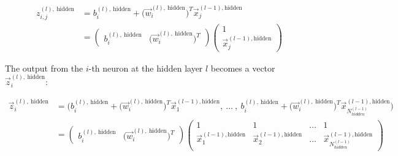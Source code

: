 \documentclass[11pt]{article}
\begin{document}
\[
\begin{aligned}
z_{i,j}^{(l),\ \text{hidden}} &= b_i^{(l), \ \text{hidden}} + \big(\vec{w}_{i}^{(l), \ \text{hidden}}\big)^T\vec{x}_j^{(l-1),\text{hidden} } \\
&= 
\begin{pmatrix}
b_i^{(l), \ \text{hidden}}  & \big(\vec{w}_{i}^{(l), \ \text{hidden}}\big)^T
\end{pmatrix}
\begin{pmatrix}
1  \\
\vec{x}_j^{(l-1),\text{hidden} }
\end{pmatrix} 
\end{aligned}
\]

The output from the \(i\)-th neuron at the hidden layer \(l\) becomes a
vector \(\vec{z}_{i}^{(l),\ \text{hidden}}\):

\[
\begin{aligned}
\vec{z}_{i}^{(l),\ \text{hidden}} &= \Big(  b_i^{(l), \ \text{hidden}} + \big(\vec{w}_{i}^{(l), \ \text{hidden}}\big)^T\vec{x}_1^{(l-1),\text{hidden} }, \ \dots \ , \  b_i^{(l), \ \text{hidden}} + \big(\vec{w}_{i}^{(l), \ \text{hidden}}\big)^T\vec{x}_{N_{hidden}^{(l-1)}}^{(l-1),\text{hidden} } \Big) \\
&= 
\begin{pmatrix}
b_i^{(l), \ \text{hidden}} & \big(\vec{w}_{i}^{(l), \ \text{hidden}}\big)^T
\end{pmatrix}
\begin{pmatrix}
1 & 1 & \dots & 1 \\
\vec{x}_{1}^{(l-1),\text{hidden} } & \vec{x}_{2}^{(l-1),\text{hidden} } & \dots & \vec{x}_{N_{hidden}^{(l-1)}}^{(l-1),\text{hidden} }
\end{pmatrix}
\end{aligned}
\]
\end{document}
